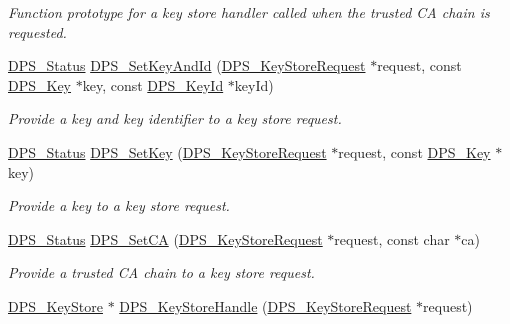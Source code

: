 \begin{DoxyCompactItemize}
\begin{DoxyCompactList}\small\item\em Function prototype for a key store handler called when the trusted CA chain is requested. \end{DoxyCompactList}\item 
\hyperlink{group__status_ga30395a84d3cad9d4ec29848106415038}{D\+P\+S\+\_\+\+Status} \hyperlink{group__keystore_ga289b1c74c01c9988f04297aa082986de}{D\+P\+S\+\_\+\+Set\+Key\+And\+Id} (\hyperlink{group__keystore_ga7c3e50965b65334e9791780fa855ed16}{D\+P\+S\+\_\+\+Key\+Store\+Request} $\ast$request, const \hyperlink{group__keystore_gaa56a1429b6a1658e674eea558bdbbfc0}{D\+P\+S\+\_\+\+Key} $\ast$key, const \hyperlink{group__keystore_ga4345e29dd2ad5d7fd88a1e988787bd72}{D\+P\+S\+\_\+\+Key\+Id} $\ast$key\+Id)
\begin{DoxyCompactList}\small\item\em Provide a key and key identifier to a key store request. \end{DoxyCompactList}\item 
\hyperlink{group__status_ga30395a84d3cad9d4ec29848106415038}{D\+P\+S\+\_\+\+Status} \hyperlink{group__keystore_ga15d6a9b8256b67c2ec8b1d365a98dbab}{D\+P\+S\+\_\+\+Set\+Key} (\hyperlink{group__keystore_ga7c3e50965b65334e9791780fa855ed16}{D\+P\+S\+\_\+\+Key\+Store\+Request} $\ast$request, const \hyperlink{group__keystore_gaa56a1429b6a1658e674eea558bdbbfc0}{D\+P\+S\+\_\+\+Key} $\ast$key)
\begin{DoxyCompactList}\small\item\em Provide a key to a key store request. \end{DoxyCompactList}\item 
\hyperlink{group__status_ga30395a84d3cad9d4ec29848106415038}{D\+P\+S\+\_\+\+Status} \hyperlink{group__keystore_ga37595f3207e42c52f7006659399135b2}{D\+P\+S\+\_\+\+Set\+CA} (\hyperlink{group__keystore_ga7c3e50965b65334e9791780fa855ed16}{D\+P\+S\+\_\+\+Key\+Store\+Request} $\ast$request, const char $\ast$ca)
\begin{DoxyCompactList}\small\item\em Provide a trusted CA chain to a key store request. \end{DoxyCompactList}\item 
\hyperlink{group__keystore_gaf3833cfe48f848f698514bc5daa075fa}{D\+P\+S\+\_\+\+Key\+Store} $\ast$ \hyperlink{group__keystore_ga088b3dc5eff10ab334d1e2aa0a329c26}{D\+P\+S\+\_\+\+Key\+Store\+Handle} (\hyperlink{group__keystore_ga7c3e50965b65334e9791780fa855ed16}{D\+P\+S\+\_\+\+Key\+Store\+Request} $\ast$request)

\end{DoxyCompactItemize}
